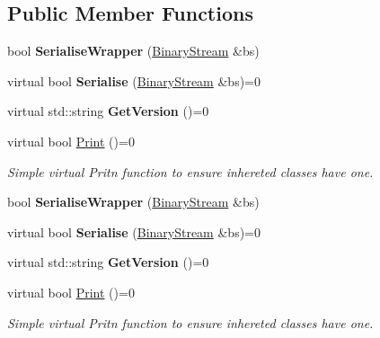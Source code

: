 \subsection*{Public Member Functions}
\begin{DoxyCompactItemize}
\item 
\hypertarget{classSerialisableObject_a3783b1798068a4bdc58fe6cdf7f7929b}{bool {\bfseries Serialise\-Wrapper} (\hyperlink{classBinaryStream}{Binary\-Stream} \&bs)}\label{classSerialisableObject_a3783b1798068a4bdc58fe6cdf7f7929b}

\item 
\hypertarget{classSerialisableObject_ab8916a102bc94764f023b1713fb040db}{virtual bool {\bfseries Serialise} (\hyperlink{classBinaryStream}{Binary\-Stream} \&bs)=0}\label{classSerialisableObject_ab8916a102bc94764f023b1713fb040db}

\item 
\hypertarget{classSerialisableObject_a345b21d2a7c869dedd96ad691fc602bd}{virtual std\-::string {\bfseries Get\-Version} ()=0}\label{classSerialisableObject_a345b21d2a7c869dedd96ad691fc602bd}

\item 
\hypertarget{classSerialisableObject_a9055c98969917d4c652eefdc924b6b75}{virtual bool \hyperlink{classSerialisableObject_a9055c98969917d4c652eefdc924b6b75}{Print} ()=0}\label{classSerialisableObject_a9055c98969917d4c652eefdc924b6b75}

\begin{DoxyCompactList}\small\item\em Simple virtual Pritn function to ensure inhereted classes have one. \end{DoxyCompactList}\item 
\hypertarget{classSerialisableObject_a3783b1798068a4bdc58fe6cdf7f7929b}{bool {\bfseries Serialise\-Wrapper} (\hyperlink{classBinaryStream}{Binary\-Stream} \&bs)}\label{classSerialisableObject_a3783b1798068a4bdc58fe6cdf7f7929b}

\item 
\hypertarget{classSerialisableObject_ab8916a102bc94764f023b1713fb040db}{virtual bool {\bfseries Serialise} (\hyperlink{classBinaryStream}{Binary\-Stream} \&bs)=0}\label{classSerialisableObject_ab8916a102bc94764f023b1713fb040db}

\item 
\hypertarget{classSerialisableObject_a345b21d2a7c869dedd96ad691fc602bd}{virtual std\-::string {\bfseries Get\-Version} ()=0}\label{classSerialisableObject_a345b21d2a7c869dedd96ad691fc602bd}

\item 
\hypertarget{classSerialisableObject_a9055c98969917d4c652eefdc924b6b75}{virtual bool \hyperlink{classSerialisableObject_a9055c98969917d4c652eefdc924b6b75}{Print} ()=0}\label{classSerialisableObject_a9055c98969917d4c652eefdc924b6b75}

\begin{DoxyCompactList}\small\item\em Simple virtual Pritn function to ensure inhereted classes have one. \end{DoxyCompactList}\end{DoxyCompactItemize}


